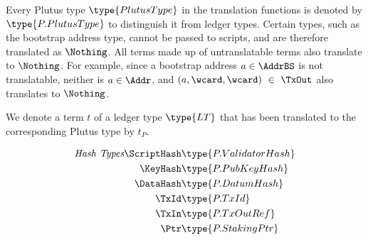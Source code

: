 Every Plutus type $\type{PlutusType}$ in the translation functions is denoted
by $\type{P.PlutusType}$ to distinguish it from ledger types. Certain
types, such as the bootstrap address type, cannot be passed to scripts, and
are therefore translated as $\Nothing$. All terms made up of untranslatable
terms also translate to $\Nothing$. For example, since a bootstrap address $a \in \AddrBS$
is not translatable, neither is $a\in\Addr$, and $(a,\wcard,\wcard)~\in~\TxOut$
also translates to $\Nothing$.

We denote a term $t$ of a ledger type $\type{LT}$ that has been translated to the
corresponding Plutus type by $t_P$.

\begin{figure*}[htb]
  \begin{align*}
    \emph{Hash Types}
    \ScriptHash & \type{P.ValidatorHash} \\
    \KeyHash & \type{P.PubKeyHash} \\
    \DataHash & \type{P.DatumHash} \\

    \TxId & \type{P.TxId} \\
    \TxIn & \type{P.TxOutRef} \\

    \Ptr & \type{P.StakingPtr} \\


\end{align*}
\end{figure*}
